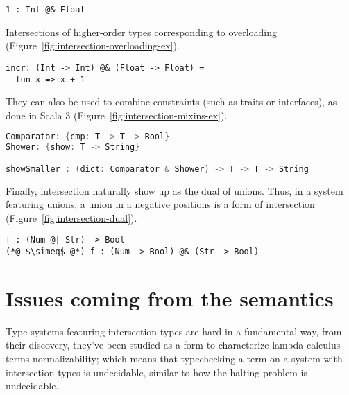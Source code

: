 \documentclass[sigplan,10pt,review,anonymous]{acmart}
\newcommand{\info}[2][1=]{}
\begin{document}
\label{fig:intersection-subytping-ex}
\begin{lstlisting}[title={Value subtyping}]
1 : Int @& Float
\end{lstlisting}

Intersections of higher-order types corresponding to overloading
(Figure~\ref{fig:intersection-overloading-ex}).

\label{fig:intersection-overloading-ex}
\begin{lstlisting}[title={Overloading}]
incr: (Int -> Int) @& (Float -> Float) =
  fun x => x + 1
\end{lstlisting}

They can also be used to combine constraints (such as traits or interfaces), as
done in Scala 3 (Figure~\ref{fig:intersection-mixins-ex}).

\label{fig:intersection-mixins-ex}
\begin{lstlisting}[language=Scala,title={Structural mixins}]
Comparator: {cmp: T -> T -> Bool}
Shower: {show: T -> String}

showSmaller : (dict: Comparator & Shower) -> T -> T -> String
\end{lstlisting}

Finally, intersection naturally show up as the dual of unions. Thus, in a system
featuring unions, a union in a negative positions is a form of intersection
(Figure~\ref{fig:intersection-dual}).

\label{fig:intersection-dual}
\begin{lstlisting}[title={Intersection as the dual of unions}]
f : (Num @| Str) -> Bool
(*@ $\simeq$ @*) f : (Num -> Bool) @& (Str -> Bool)
\end{lstlisting}


\newpage

\section{Issues coming from the semantics}
\label{sec:issues-sem}
\info{What goes wrong or difficult when trying to implement union and
  intersection literally}

Type systems featuring intersection types are hard in a fundamental way,
from their discovery, they've been studied as a form to characterize
lambda-calculus terms normalizability; which means that typechecking a
term on a system with intersection types is undecidable,
similar to how the halting problem is undecidable.
\end{document}
